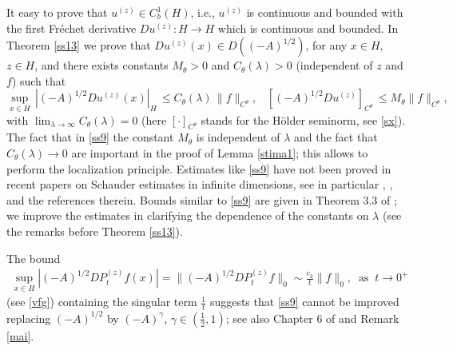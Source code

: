 \documentclass[preprint]{imsart}
\begin{document}
     It easy to prove that  $u^{(z)} \in C^1_b(H) $, i.e., $u^{(z)}$ is continuous and bounded with  the first {   Fr\'echet} derivative $Du^{(z)} : H \to H$ which is continuous and bounded.   
  In  Theorem \ref{ss13}   we prove   that  $D u^{(z)} (x) \in D((-A)^{1/2})$, for any $x \in H,$ $z \in H$,  and there exists  constants $ M_{\theta} >0 $ and $ C_{\theta}(\lambda) >0 $ (independent of $z$ and $f$)
 such that 
\begin{equation}\label{ss9}     
 \sup_{x \in H}\, | (-A)^{1/2} Du^{(z)}(x) |_{H} \, \le  C_{\theta}(\lambda) \, \| f \|_{C^{\theta}}, 
 \;\;\;
  [ (-A)^{1/2} Du^{(z)} ]_{C^{\theta}} \, \le  M_{\theta} \| f \|_{C^{\theta}}, 
\end{equation} 
with $\lim_{\lambda \to \infty} C_{\theta}(\lambda) =0$ (here $ [ \cdot ]_{C^{\theta}} $ stands for the H\"older seminorm, see \eqref{sx}).   
  The fact that 
in \eqref{ss9} the  constant $M_{\theta}$ is independent of $\lambda$ and the fact that
 $C_{\theta}(\lambda) \to 0$ are  important in the proof of Lemma \ref{stima1}; this   allows to perform the localization principle. 
 Estimates like \eqref{ss9} have not been proved in recent papers on Schauder estimates in infinite dimensions, see in particular 
 \cite{bass}, \cite{CL},   \cite{LR} and the references therein.   Bounds similar to \eqref{ss9} are given  in Theorem 3.3 of \cite{D2};  we  improve the estimates in \cite{D2}
  clarifying   the  dependence of the constants on $\lambda$ 
  (see the remarks before  Theorem \ref{ss13}).
  
  {    The  bound 
  \begin{equation} \label{ww5}
  \begin{array}{l}
   \sup_{x \in H} | (-A)^{1/2} D P_t^{(z)} f (x) |
    = 
\| (-A)^{1/2} D P_t^{(z)} f\|_0 \sim \frac{ c_2}{t} \| f\|_0, \;\;\text{as} \;\;  t \to 0^+
\end{array}  
\end{equation}
 (see \eqref{vfg})  
 containing 
 the singular term $\frac{1}{t}$ 
 suggests  
 that \eqref{ss9}
 cannot be    improved
 replacing $(-A)^{1/2}$ by  $(-A)^{\gamma}$, $\gamma \in (\frac{1}{2}, 1)$; 
 see  also 
 Chapter 6 of \cite{DZ1} and Remark \ref{mai}.}  
  
\end{document}
